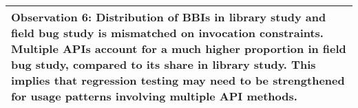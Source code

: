 \noindent
\begin{tabular}{|p{16cm}|}
	\hline
	\textbf{Observation 6:} Distribution of BBIs in library study and field bug study is mismatched on invocation constraints. Multiple APIs account for a much higher proportion in field bug study, compared to its share in library study. This implies that regression testing may need to be strengthened for usage patterns involving multiple API methods. 	
	\\
	\hline
\end{tabular}
\medskip
\vspace{+0.05cm}


		
